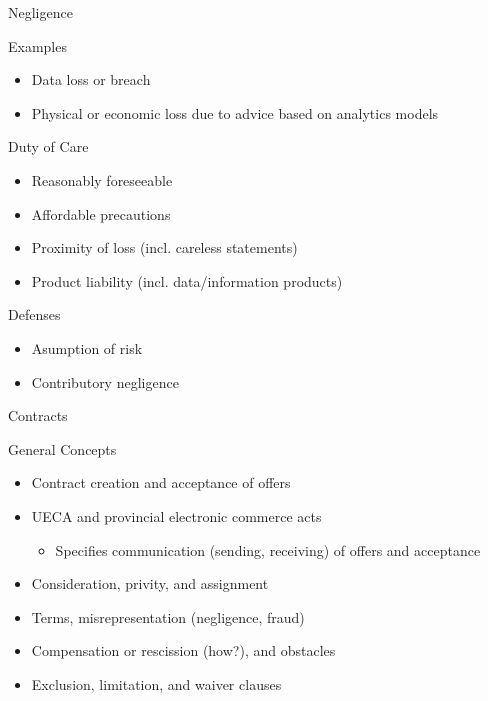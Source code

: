 \documentclass[ignorenonframetext,xcolor=x11names]{beamer}
\begin{document}
\begin{frame}[label=full]{Negligence}
\begin{block}{Examples}
\begin{itemize}
  \item Data loss or breach
  \item Physical or economic loss due to advice based on analytics models
\end{itemize}
\end{block}

\begin{block}{Duty of Care}
  \begin{itemize}
    \item Reasonably foreseeable
    \item Affordable precautions
    \item Proximity of loss (incl. careless statements)
    \item Product liability (incl. data/information products)
  \end{itemize}
\end{block}
\begin{block}{Defenses}
  \begin{itemize}
     \item Asumption of risk
     \item Contributory negligence
  \end{itemize}
\end{block}
\end{frame}

\begin{frame}[label=full]{Contracts} 
  \begin{block}{General Concepts}
  \begin{itemize}
     \item Contract creation and acceptance of offers
     \item UECA and provincial electronic commerce acts
     \begin{itemize}
        \item Specifies communication (sending, receiving) of offers and acceptance
     \end{itemize}
     \item Consideration, privity, and assignment
     \item Terms, misrepresentation (negligence, fraud)
     \item Compensation or rescission (how?), and obstacles
     \item Exclusion, limitation, and waiver clauses
  \end{itemize}
  \end{block}
\end{frame}
\end{document}
